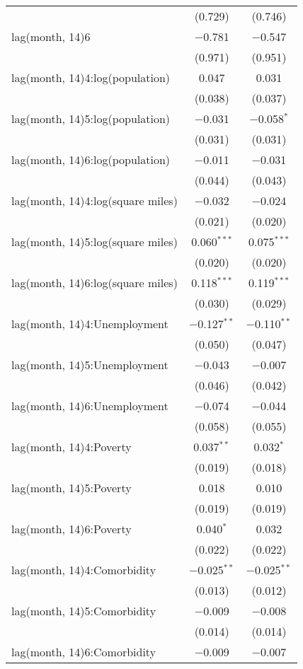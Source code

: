 \begin{tabular}{@{\extracolsep{1pt}}lcc}
  & (0.729) & (0.746) \\ 
  lag(month, 14)6 & $-$0.781 & $-$0.547 \\ 
  & (0.971) & (0.951) \\ 
  lag(month, 14)4:log(population) & 0.047 & 0.031 \\ 
  & (0.038) & (0.037) \\ 
  lag(month, 14)5:log(population) & $-$0.031 & $-$0.058$^{*}$ \\ 
  & (0.031) & (0.031) \\ 
  lag(month, 14)6:log(population) & $-$0.011 & $-$0.031 \\ 
  & (0.044) & (0.043) \\ 
  lag(month, 14)4:log(square miles) & $-$0.032 & $-$0.024 \\ 
  & (0.021) & (0.020) \\ 
  lag(month, 14)5:log(square miles) & 0.060$^{***}$ & 0.075$^{***}$ \\ 
  & (0.020) & (0.020) \\ 
  lag(month, 14)6:log(square miles) & 0.118$^{***}$ & 0.119$^{***}$ \\ 
  & (0.030) & (0.029) \\ 
  lag(month, 14)4:Unemployment & $-$0.127$^{**}$ & $-$0.110$^{**}$ \\ 
  & (0.050) & (0.047) \\ 
  lag(month, 14)5:Unemployment & $-$0.043 & $-$0.007 \\ 
  & (0.046) & (0.042) \\ 
  lag(month, 14)6:Unemployment & $-$0.074 & $-$0.044 \\ 
  & (0.058) & (0.055) \\ 
  lag(month, 14)4:Poverty & 0.037$^{**}$ & 0.032$^{*}$ \\ 
  & (0.019) & (0.018) \\ 
  lag(month, 14)5:Poverty & 0.018 & 0.010 \\ 
  & (0.019) & (0.019) \\ 
  lag(month, 14)6:Poverty & 0.040$^{*}$ & 0.032 \\ 
  & (0.022) & (0.022) \\ 
  lag(month, 14)4:Comorbidity & $-$0.025$^{**}$ & $-$0.025$^{**}$ \\ 
  & (0.013) & (0.012) \\ 
  lag(month, 14)5:Comorbidity & $-$0.009 & $-$0.008 \\ 
  & (0.014) & (0.014) \\ 
  lag(month, 14)6:Comorbidity & $-$0.009 & $-$0.007 \\ 

\end{tabular}
